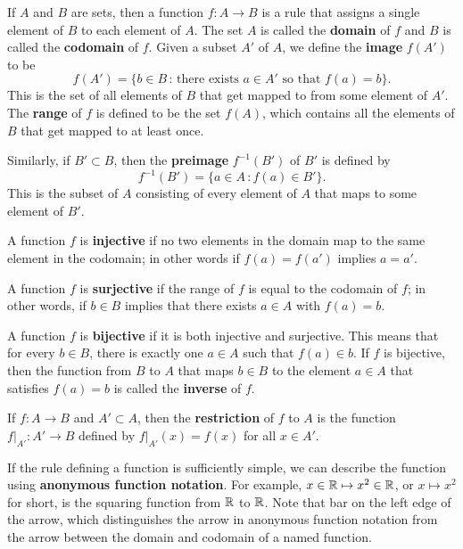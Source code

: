 \documentclass[svgnames]{watsonbook}
\begin{document}
\begin{tcolorbox}[title = Functions, breakable, parbox = false, colframe = MidnightBlue, colback=softblue] 
If $A$ and $B$ are sets, then a function $f:A \to B$ is a rule that assigns a single element of $B$ to each element of $A$. The set $A$ is called the \textbf{domain} of $f$ and $B$ is called the \textbf{codomain} of $f$. Given a subset $A'$ of  $A$, we define the \textbf{image} $f(A')$ to be 
\begin{equation} \label{eq:image} 
f(A') = \{b \in B \, : \, \text{there exists }a \in A' \text{ so that } f(a) = b\}. 
\end{equation} 
This is the set of all elements of $B$ that get mapped to from some element of $A'$. The \textbf{range} of $f$ is defined to be the set $f(A)$, which contains all the elements of $B$ that get mapped to at least once. 

Similarly, if $B'\subset B$, then the \textbf{preimage} $f^{-1}(B')$ of $B'$ is defined by 
\[
f^{-1}(B') = \{a \in A \, : f(a) \in B'\}. 
\]
This is the subset of $A$ consisting of every element of $A$ that maps to some element of $B'$. 

A function $f$ is \textbf{injective} if no two elements in the domain map to the same element in the codomain; in other words if $f(a) = f(a')$ implies $a=a'$. 

A function $f$ is \textbf{surjective} if the range of $f$ is equal to the codomain of $f$; in other words, if $b \in B$ implies that there exists $a\in A$ with $f(a) = b$. 

A function $f$ is \textbf{bijective} if it is both injective and
surjective. This means that for every $b\in B$, there is exactly one
$a\in A$ such that $f(a) \in b$. If $f$ is bijective, then the
function from $B$ to $A$ that maps $b\in B$ to the element $a \in A$
that satisfies $f(a) = b$ is called the \textbf{inverse} of $f$.

If $f: A \to B$ and $A' \subset A$, then the \textbf{restriction} of
$f$ to $A$ is the function $\left. f \right|_{A'} : A' \to B$ defined
by $\left. f \right|_{A'}(x) = f(x)$ for all $x \in A'$. 

If the rule defining a function is sufficiently simple, we can
describe the function using \textbf{anonymous function notation}. For
example, $x \in \mathbb{R}\mapsto x^2 \in \mathbb{R}$, or $x\mapsto x^2$ for short, is
the squaring function from $\mathbb{R}$ to $\mathbb{R}$. Note that bar on the left
edge of the arrow, which distinguishes the arrow in anonymous function
notation from the arrow between the domain and codomain of a named
function.
\end{tcolorbox}
\end{document}
